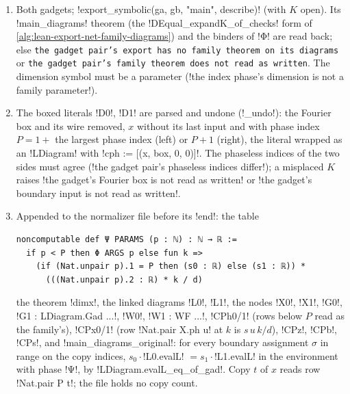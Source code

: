 {\begin{algorithm}\label{alg:lean-export-net-copyphase}
\begin{enumerate}
\item \begin{sloppypar}Both gadgets; \py!export_symbolic(ga, gb, "main", describe)! (with $K$ open). Its
  \code!main_diagrams! theorem (the \lean!DEqual_expandK_of_checks! form of
  \cref{alg:lean-export-net-family-diagrams}) and the binders of \leanx!Φ! are read back; else
  \texttt{the gadget pair's export has no family theorem on its diagrams} or
  \texttt{the gadget pair's family theorem does not read as written}. The dimension symbol must be a
  parameter (\code!the index phase's dimension is not a family parameter!).\end{sloppypar}
\item The boxed literals \code!D0!, \code!D1! are parsed and undone (\py!_undo!): the Fourier box
  and its wire removed, $x$ without its last input and with phase index $P = 1 + $ the largest
  phase index (left) or $P+1$ (right), the literal wrapped as an \lean!LDiagram! with
  \code!cph := [(x, box, 0, 0)]!. The phaseless indices of the two sides must agree
  (\code!the gadget pair's phaseless indices differ!); a misplaced $K$ raises
  \code!the gadget's Fourier box is not read as written! or
  \code!the gadget's boundary input is not read as written!.
\item Appended to the normalizer file before its \code!end!: the table
\begin{lstlisting}[style=leannet]
noncomputable def Ψ PARAMS (p : ℕ) : ℕ → ℝ :=
  if p < P then Φ ARGS p else fun k =>
    (if (Nat.unpair p).1 = P then (s0 : ℝ) else (s1 : ℝ)) *
      (((Nat.unpair p).2 : ℝ) * k / d)
\end{lstlisting}
  the theorem \code!dimx!, the linked diagrams \code!L0!, \code!L1!, the nodes \code!X0!,
  \code!X1!, \code!G0!, \code!G1 : LDiagram.Gad ...!, \code!W0!, \code!W1 : WF ...!,
  \code!CPh0/1! (rows below $P$ read as the family's), \code!CPx0/1! (row
  \lean!Nat.pair X.ph u! at $k$ is $s\,u\,k/d$), \code!CPz!, \code!CPb!, \code!CPs!, and
  \code!main_diagrams_original!: for every boundary assignment $\sigma$ in range on the copy
  indices, $s_0\cdot$\lean!L0.evalL! $= s_1\cdot$\lean!L1.evalL! in the environment with phase
  \leanx!Ψ!, by \lean!LDiagram.evalL_eq_of_gad!. Copy $t$ of $x$ reads row \lean!Nat.pair P t!;
  the file holds no copy count.
\end{enumerate}
\end{algorithm}

}
